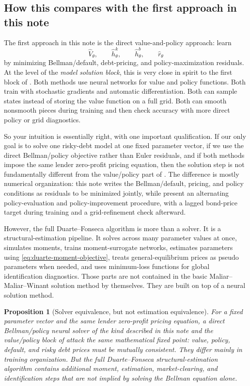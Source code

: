\documentclass[11pt]{article}
\newtheorem{proposition}{Proposition}
\newcommand{\1}{\mathbf{1}}
\begin{document}
\subsection{How this compares with the first approach in this note}

The first approach in this note is the direct value-and-policy approach: learn
\[
  \widehat V_\theta,\qquad
  \widehat h^k_\theta,\qquad
  \widehat h^b_\theta,\qquad
  \widehat r_\theta
\]
by minimizing Bellman/default, debt-pricing, and policy-maximization residuals.
At the level of the \emph{model solution block}, this is very close in spirit to
the first block of \citet{duartefonseca2026ai}. Both methods use neural networks
for value and policy functions. Both train with stochastic gradients and
automatic differentiation. Both can sample states instead of storing the value
function on a full grid. Both can smooth nonsmooth pieces during training and
then check accuracy with more direct policy or grid diagnostics.

So your intuition is essentially right, with one important qualification. If
our only goal is to solve one risky-debt model at one fixed parameter vector,
if we use the direct Bellman/policy objective rather than Euler residuals, and
if both methods impose the same lender zero-profit pricing equation, then the
solution step is not fundamentally different from the value/policy part of
\citet{duartefonseca2026ai}. The difference is mostly numerical organization:
this note writes the Bellman/default, pricing, and policy conditions as
residuals to be minimized jointly, while \citet{duartefonseca2026ai} present an
alternating policy-evaluation and policy-improvement procedure, with a lagged
bond-price target during training and a grid-refinement check afterward.

However, the full Duarte--Fonseca algorithm is more than a solver. It is a
structural-estimation pipeline. It solves across many parameter values at once,
simulates moments, trains moment-surrogate networks, estimates parameters using
\cref{eq:duarte-moment-objective}, treats general-equilibrium prices as pseudo
parameters when needed, and uses minimum-loss functions for global
identification diagnostics. Those parts are not contained in the basic
Maliar--Maliar--Winant solution method by themselves. They are built on top of
a neural solution method.

\begin{proposition}[Solver equivalence, but not estimation equivalence]
\label{prop:duarte-maliar-comparison}
For a fixed parameter vector and the same lender zero-profit pricing equation,
a direct Bellman/policy neural solver of the kind described in this note and
the value/policy block of \citet{duartefonseca2026ai} attack the same
mathematical fixed point: value, policy, default, and risky debt prices must be
mutually consistent. They differ mainly in training organization. But the full
Duarte--Fonseca structural-estimation algorithm contains additional moment,
estimation, market-clearing, and identification steps that are not implied by
solving the Bellman equation alone.
\end{proposition}
\end{document}
